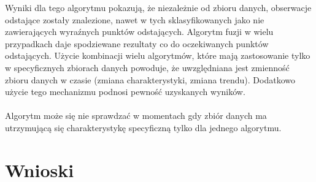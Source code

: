 \documentclass[eng,printmode]{mgr}
\begin{document}
Wyniki dla tego algorytmu pokazują, że niezależnie od zbioru danych, obserwacje odstające zostały znalezione, nawet w tych sklasyfikowanych jako nie zawierających wyraźnych punktów odstających. Algorytm fuzji w wielu przypadkach daje spodziewane rezultaty co do oczekiwanych punktów odstających. Użycie kombinacji wielu algorytmów, które mają zastosowanie tylko w specyficznych zbiorach danych powoduje, że uwzględniana jest zmienność zbioru danych w czasie (zmiana charakterystyki, zmiana trendu). Dodatkowo użycie tego mechanizmu podnosi pewność uzyskanych wyników.
\\\\
Algorytm może się nie sprawdzać w momentach gdy zbiór danych ma utrzymującą się charakterystykę specyficzną tylko dla jednego algorytmu.
\section{Wnioski}



\end{document}
